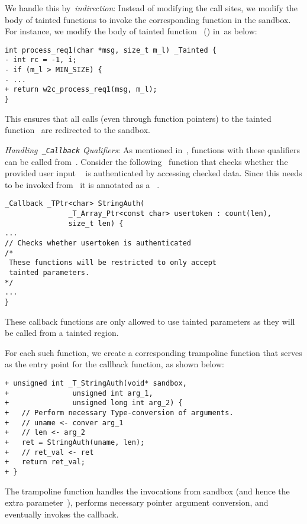 We handle this by~\emph{indirection}: Instead of modifying the call sites, we modify the body of tainted functions to invoke the corresponding function in the sandbox.
For instance, we modify the body of tainted function~ () in~\cregion as below:
\begin{verbatim}
int process_req1(char *msg, size_t m_l) _Tainted {
- int rc = -1, i;
- if (m_l > MIN_SIZE) {
- ...
+ return w2c_process_req1(msg, m_l);
}
\end{verbatim}
This ensures that all calls (even through function pointers) to the tainted function~ are redirected to the sandbox.

\noindent\emph{Handling~\texttt{\_Callback} Qualifiers}:
As mentioned in~, functions with these qualifiers can be called from~\ucregion.
Consider the following~ function that checks whether the provided user input ~ is authenticated by accessing checked data. Since this needs to be invoked from ~\ucregion it is annotated as a ~.
\begin{verbatim}
_Callback _TPtr<char> StringAuth(
               _T_Array_Ptr<const char> usertoken : count(len),
               size_t len) {
...
// Checks whether usertoken is authenticated
/*
 These functions will be restricted to only accept
 tainted parameters.
*/
...
}
\end{verbatim}
These callback functions are only allowed to use tainted parameters as they will be called from a tainted region.


For each such function, we create a corresponding trampoline function that serves as the entry point for the callback function, as shown below:
\begin{verbatim}
+ unsigned int _T_StringAuth(void* sandbox,
+               unsigned int arg_1,
+               unsigned long int arg_2) {
+   // Perform necessary Type-conversion of arguments.
+   // uname <- conver arg_1
+   // len <- arg_2
+   ret = StringAuth(uname, len);
+   // ret_val <- ret
+   return ret_val;
+ }
\end{verbatim}

The trampoline function handles the invocations from sandbox (and hence the extra parameter~), performs necessary pointer argument conversion, and eventually invokes the callback.

